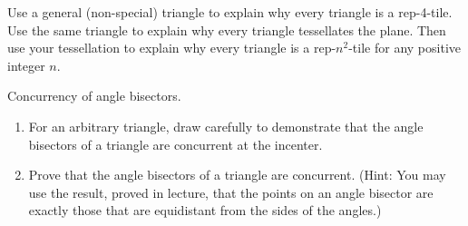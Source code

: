 \begin{prob}
Use a general (non-special) triangle to explain why every triangle is a rep-4-tile.  
Use the same triangle to explain why every triangle tessellates the plane.  Then use your tessellation to explain why every triangle is a rep-$n^2$-tile for any positive integer $n$. 
\end{prob}

\begin{prob} 
Concurrency of angle bisectors. 
\begin{enumerate}
\item For an arbitrary triangle, draw carefully to demonstrate that the angle bisectors of a triangle are concurrent at the incenter.   
\item Prove that the angle bisectors of a triangle are concurrent.  (Hint:  You may use the result, proved in lecture, that the points on an angle bisector are exactly those that are equidistant from the sides of the angles.)  
\end{enumerate}
\end{prob} 


%


